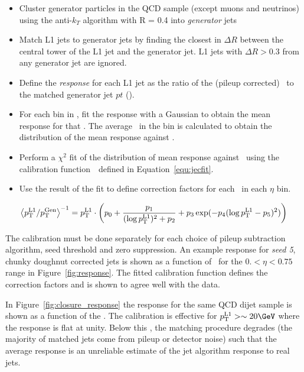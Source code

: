 \begin{itemize}
\item Cluster generator particles in the QCD sample (except muons and neutrinos) using the anti-$k_T$ algorithm with R = 0.4 into \emph{generator} jets
\item Match L1 jets to generator jets by finding the closest in $\Delta R$ between the central tower of the L1 jet and the generator jet. L1 jets with 
$\Delta R > 0.3$ from any generator jet are ignored.
\item Define the \emph{response} for each L1 jet as the ratio of the (pileup corrected) \Lonept~to the matched generator jet $pt$ (\Genpt).
\item For each bin in \Genpt, fit the response with a Gaussian to obtain the mean response for that \Genpt. 
The average \Lonept~in the bin is calculated to obtain the distribution of the mean response against \Lonept.
\item Perform a $\chi^2$ fit of the distribution of mean response against \Lonept~using the calibration
 function~\cite{l1jet_calibration}~defined in Equation~\ref{equ:jecfit}.
\item Use the result of the fit to define correction factors for each \Lonept~in each $\eta$ bin.
\end{itemize}

\begin{equation}
\left<{p_{\text T}^{\text{L1}}}/{p_{\text T}^{\text{Gen}}}\right>^{-1} = {p_{\text T}^{\text{L1}}} \cdot \left ( p_{0} + 
\frac{p_{1}}{(\log {p_{\text T}^{\text{L1}}})^{2}+p_{2}}+p_{3} \exp(-p_{4}
(\log {p_{\text T}^{\text{L1}}}-p_{5} ) ^{2}) \right )
\label{equ:jecfit}
\end{equation}

The calibration must be done separately for each choice of pileup subtraction algorithm, seed threshold and zero suppression. 
An example response for \emph{seed 5}, chunky doughnut corrected jets is shown as a function of \Lonept~for 
the $0. < \eta < 0.75$ range in Figure~\ref{fig:response}. The fitted calibration function defines the correction 
factors and is shown to agree well with the data.

In Figure~\ref{fig:closure_response} the response for the same QCD dijet sample is shown as a function of the \Lonept. The calibration
is effective for $\Lonept > \sim 20\GeV$ where the response is flat at unity. Below this \pt,
the matching procedure degrades (the majority of matched jets come from pileup or detector noise) 
such that the average response is an unreliable estimate of the jet algorithm response to real jets.

